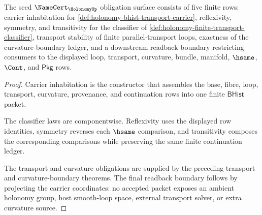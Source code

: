 \begin{theorem}
\label{thm:holonomy-certificate-boundary}
The seed $\NameCert_{\HolonomyUp}$ obligation surface consists of five finite rows: carrier inhabitation for \autoref{def:holonomy-bhist-transport-carrier}, reflexivity, symmetry, and transitivity for the classifier of \autoref{def:holonomy-finite-transport-classifier}, transport stability of finite parallel-transport loops, exactness of the curvature-boundary ledger, and a downstream readback boundary restricting consumers to the displayed loop, transport, curvature, bundle, manifold, $\hsame$, $\Cont$, and $\mathsf{Pkg}$ rows.
\end{theorem}
\begin{proof}
Carrier inhabitation is the constructor that assembles the base, fibre, loop, transport, curvature, provenance, and continuation rows into one finite $\mathsf{BHist}$ packet.

The classifier laws are componentwise. Reflexivity uses the displayed row identities, symmetry reverses each $\hsame$ comparison, and transitivity composes the corresponding comparisons while preserving the same finite continuation ledger.

The transport and curvature obligations are supplied by the preceding transport and curvature-boundary theorems. The final readback boundary follows by projecting the carrier coordinates: no accepted packet exposes an ambient holonomy group, host smooth-loop space, external transport solver, or extra curvature source.
\end{proof}

